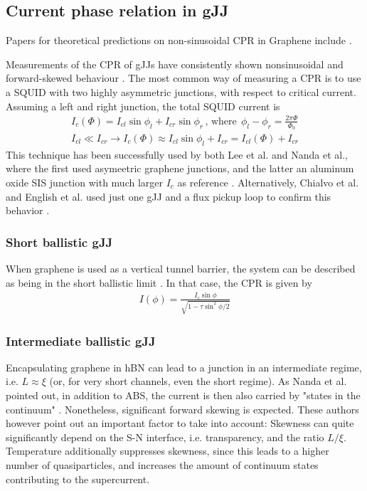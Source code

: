 \subsection{Current phase relation in gJJ}
Papers for theoretical predictions on non-sinusoidal CPR in Graphene include \cite{titov_josephson_2006,black-schaffer_self-consistent_2008,girit_currentphase_2009,black-schaffer_strongly_2010,hagymasi_josephson_2010} .

Measurements of the CPR of gJJs have consistently shown nonsinusoidal and forward-skewed behaviour \cite{chialvo_current-phase_2010,lee_ultimately_2015,english_observation_2016,nanda_current-phase_2017}.
The most common way of measuring a CPR is to use a SQUID with two highly asymmetric junctions, with respect to critical current.
Assuming a left and right junction, the total SQUID current is
\begin{eqnarray}
I_c(\Phi)=I_{cl}\sin\phi_l + I_{cr}\sin\phi_r \,\mathrm{,\,where\,}\; \phi_l - \phi_r = \frac{2\pi\Phi}{\Phi_0} \\%
I_{cl} \ll I_{cr} \rightarrow I_c(\Phi) \approx I_{cl}\sin\phi_l + I_{cr} = I_{cl}(\Phi) + I_{cr}
\end{eqnarray}
This technique has been successfully used by both Lee et al. and Nanda et al., where the first used asymeetric graphene junctions, and the latter an aluminum oxide SIS junction with much larger $I_c$ as reference \cite{lee_ultimately_2015,nanda_current-phase_2017}.
Alternatively, Chialvo et al. and English et al. used just one gJJ and a flux pickup loop to confirm this behavior \cite{chialvo_current-phase_2010,english_observation_2016}.

\subsubsection{Short ballistic gJJ}
When graphene is used as a vertical tunnel barrier, the system can be described as being in the short ballistic limit \cite{lee_ultimately_2015}.
In that case, the CPR is given by
\begin{eqnarray}
I(\phi)=\frac{I_c\sin\phi}{\sqrt{1-\tau\sin^2\phi/2}}
\end{eqnarray}

\subsubsection{Intermediate ballistic gJJ}
Encapsulating graphene in hBN can lead to a junction in an intermediate regime, i.e. $L\approx\xi$ (or, for very short channels, even the short regime).
As Nanda et al. pointed out, in addition to ABS, the current is then also carried by "states in the continuum" \cite{nanda_current-phase_2017}.
Nonetheless, significant forward skewing is expected.
These authors however point out an important factor to take into account:
Skewness can quite significantly depend on the S-N interface, i.e. transparency, and the ratio $L/\xi$.
Temperature additionally suppresses skewness, since this leads to a higher number of quasiparticles, and increases the amount of continuum states contributing to the supercurrent.

